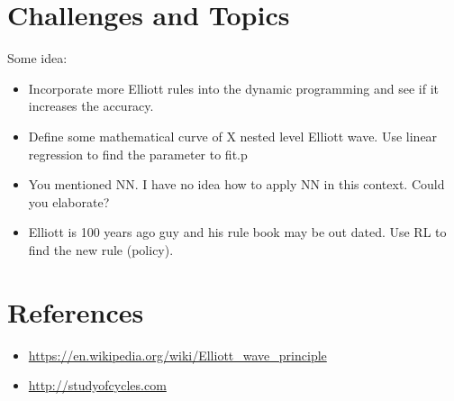 \documentclass[12pt]{article}
\begin{document}
\section*{Challenges and Topics}

Some idea:

\begin{itemize}
\item Incorporate more Elliott rules into the dynamic programming and
  see if it increases the accuracy.
\item Define some mathematical curve of X nested level Elliott
  wave. Use linear regression to find the parameter to fit.p
\item You mentioned NN. I have no idea how to apply NN in this
  context. Could you elaborate?
\item Elliott is 100 years ago guy and his rule book may be out
  dated. Use RL to find the new rule (policy).
\end{itemize}

\section*{References}

\begin{itemize}
\item \url{https://en.wikipedia.org/wiki/Elliott_wave_principle}
\item \url{http://studyofcycles.com}
\end{itemize}
     
\end{document}
